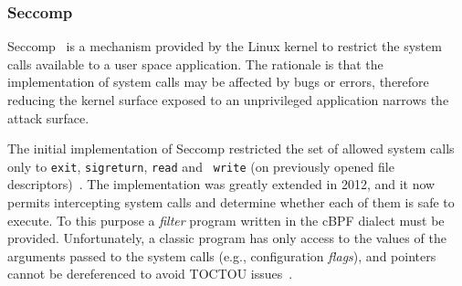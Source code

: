 \subsubsection*{Seccomp}

Seccomp~\cite{seccompbpf} is a mechanism
provided by the Linux kernel to restrict the system calls
available to a user space application. The rationale is that the
implementation of system calls may be affected by bugs or errors,
therefore reducing the kernel surface exposed to an unprivileged
application narrows the attack surface.

The initial implementation of Seccomp restricted the set of allowed
system calls only to {\tt exit}, {\tt sigreturn}, {\tt read} and {\tt
  write} (on previously opened file
descriptors)~\cite{edge2015seccomp}. The implementation was greatly
extended in 2012, and it now permits intercepting system calls and
determine whether each of them is safe to execute.
To this purpose a {\em filter} program written in the cBPF
dialect must be provided. Unfortunately, a classic program has only
access to the values of the arguments passed to the system calls
(e.g., configuration {\em flags}), and pointers cannot be dereferenced
to avoid TOCTOU issues~\cite{seccomp-toctou}.

